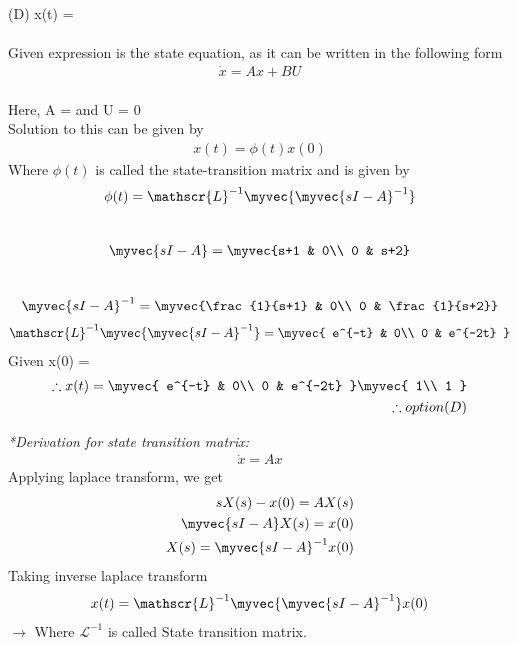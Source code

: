 \begin{enumerate}[label=\thesubsection.\arabic*.,ref=\thesubsection.\theenumi]
(D) x(t) =
\\
\\
\solution Given expression is the state equation, as it can be written in the following form
\begin{align}
    \dot{x} =Ax + BU
\end{align} \\
Here, A =   and U = 0\\
Solution to this can be given by
\begin{align}
    x(t) = \phi(t)x(0)
\end{align}
Where $\phi(t)$ is called the state-transition matrix and is given by\\
\begin{align}
    \phi(t) = \mathscr{L}^{-1}\myvec{\myvec{sI -A}^{-1}}
\end{align}\\
\begin{align}
    \myvec{sI-A} = \myvec{s+1 & 0\\ 0 & s+2}
\end{align}\\
\begin{align}
    \myvec{sI-A}^{-1} 
    = \myvec{\frac{1}{s+1} & 0\\
            0 & \frac{1}{s+2}}
\end{align}
\begin{align}
    \mathscr{L}^{-1}\myvec{\myvec{sI -A}^{-1}} = \myvec{
e^{-t} & 0\\
0 & e^{-2t}
}
\end{align}
Given x(0) = 
\begin{align}
    \therefore x(t) = \myvec{
e^{-t} & 0\\
0 & e^{-2t}
}
\myvec{
1\\
1
}\\ 
\therefore option (D)   
\end{align}
\newline
\newline

\emph{*Derivation for state transition matrix:}
\begin{align}
    \dot{x} =Ax
\end{align} 
Applying laplace transform, we get
\begin{align}
    sX(s) -x(0) = AX(s)\\
    \myvec{sI - A}X(s) = x(0)\\
    X(s) = \myvec{sI - A}^{-1}x(0)\\
\end{align} 
Taking inverse laplace transform
\begin{align}
    x(t) = \mathscr{L}^{-1}\myvec{\myvec{sI -A}^{-1}}x(0)
\end{align}
$\to$ Where $\mathscr{L}^{-1}$ is called State transition matrix.
\end{enumerate}
